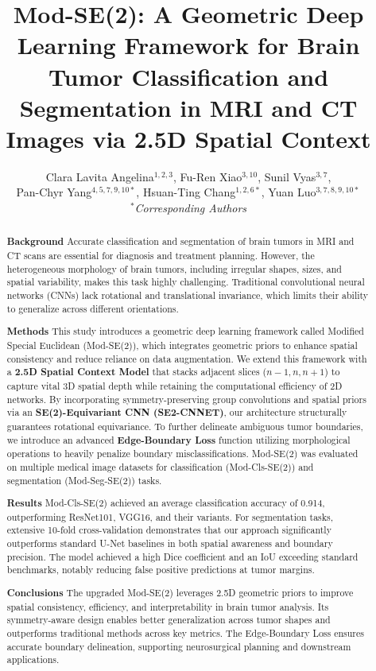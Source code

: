 \documentclass[10pt,twocolumn,letterpaper]{article}
\begin{document}
\title{Mod-SE(2): A Geometric Deep Learning Framework for Brain Tumor Classification and Segmentation in MRI and CT Images via 2.5D Spatial Context}

\author{
Clara Lavita Angelina$^{1,2,3}$, Fu-Ren Xiao$^{3,10}$, Sunil Vyas$^{3,7}$,\\
Pan-Chyr Yang$^{4,5,7,9,10*}$, Hsuan-Ting Chang$^{1,2,6*}$, Yuan Luo$^{3,7,8,9,10*}$\\
\textit{$^*$Corresponding Authors}\\
}

\maketitle

\begin{abstract}
\textbf{Background} Accurate classification and segmentation of brain tumors in MRI and CT scans are essential for diagnosis and treatment planning. However, the heterogeneous morphology of brain tumors, including irregular shapes, sizes, and spatial variability, makes this task highly challenging. Traditional convolutional neural networks (CNNs) lack rotational and translational invariance, which limits their ability to generalize across different orientations.

\textbf{Methods} This study introduces a geometric deep learning framework called Modified Special Euclidean (Mod-SE(2)), which integrates geometric priors to enhance spatial consistency and reduce reliance on data augmentation. We extend this framework with a \textbf{2.5D Spatial Context Model} that stacks adjacent slices ($n-1, n, n+1$) to capture vital 3D spatial depth while retaining the computational efficiency of 2D networks. By incorporating symmetry-preserving group convolutions and spatial priors via an \textbf{SE(2)-Equivariant CNN (SE2-CNNET)}, our architecture structurally guarantees rotational equivariance. To further delineate ambiguous tumor boundaries, we introduce an advanced \textbf{Edge-Boundary Loss} function utilizing morphological operations to heavily penalize boundary misclassifications. Mod-SE(2) was evaluated on multiple medical image datasets for classification (Mod-Cls-SE(2)) and segmentation (Mod-Seg-SE(2)) tasks.

\textbf{Results} Mod-Cls-SE(2) achieved an average classification accuracy of 0.914, outperforming ResNet101, VGG16, and their variants. For segmentation tasks, extensive 10-fold cross-validation demonstrates that our approach significantly outperforms standard U-Net baselines in both spatial awareness and boundary precision. The model achieved a high Dice coefficient and an IoU exceeding standard benchmarks, notably reducing false positive predictions at tumor margins.

\textbf{Conclusions} The upgraded Mod-SE(2) leverages 2.5D geometric priors to improve spatial consistency, efficiency, and interpretability in brain tumor analysis. Its symmetry-aware design enables better generalization across tumor shapes and outperforms traditional methods across key metrics. The Edge-Boundary Loss ensures accurate boundary delineation, supporting neurosurgical planning and downstream applications.
\end{abstract}
\end{document}
